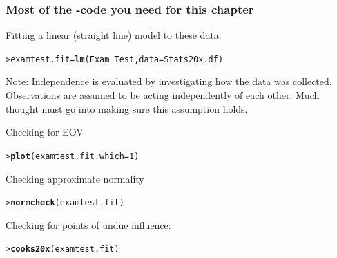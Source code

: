 \documentclass{beamer}\usepackage[]{graphicx}\usepackage[]{xcolor}
\makeatletter
\newcommand{\hlnum}[1]{\textcolor[rgb]{0.686,0.059,0.569}{#1}}%
\newcommand{\hlopt}[1]{\textcolor[rgb]{0,0,0}{#1}}%
\newcommand{\hlstd}[1]{\textcolor[rgb]{0.345,0.345,0.345}{#1}}%
\newcommand{\hlkwb}[1]{\textcolor[rgb]{0.69,0.353,0.396}{#1}}%
\newcommand{\hlkwc}[1]{\textcolor[rgb]{0.333,0.667,0.333}{#1}}%
\newcommand{\hlkwd}[1]{\textcolor[rgb]{0.737,0.353,0.396}{\textbf{#1}}}%
\newenvironment{kframe}{%
 \def\at@end@of@kframe{}%
 \ifinner\ifhmode%
  \def\at@end@of@kframe{\end{minipage}}%
  \begin{minipage}{\columnwidth}%
 \fi\fi%
 \def\FrameCommand##1{\hskip\@totalleftmargin \hskip-\fboxsep
 \colorbox{shadecolor}{##1}\hskip-\fboxsep
     \hskip-\linewidth \hskip-\@totalleftmargin \hskip\columnwidth}%
 \MakeFramed {\advance\hsize-\width
   \@totalleftmargin\z@ \linewidth\hsize
   \@setminipage}}%
 {\par\unskip\endMakeFramed%
 \at@end@of@kframe}
\newenvironment{knitrout}{}{} %
\makeatother
\begin{document}
\begin{frame}[fragile]
\frametitle{Most of the -code you need for this chapter}

Fitting a linear (straight line) model to these data.


\begin{knitrout}\scriptsize
{}\color{fgcolor}\begin{kframe}
\begin{alltt}
\hlstd{> }\hlstd{examtest.fit}\hlkwb{=}\hlkwd{lm}\hlstd{(Exam}\hlopt{~}\hlstd{Test,} \hlkwc{data}\hlstd{=Stats20x.df)}
\end{alltt}
\end{kframe}
\end{knitrout}

Note: Independence is evaluated by investigating how the data was collected. Observations are assumed to be acting independently of each other. Much thought must go into making sure this assumption holds.

Checking for EOV

\begin{knitrout}\scriptsize
{}\color{fgcolor}\begin{kframe}
\begin{alltt}
\hlstd{> }\hlkwd{plot}\hlstd{(}\hlkwc{examtest.fit.which}\hlstd{=}\hlnum{1}\hlstd{)}
\end{alltt}
\end{kframe}
\end{knitrout}

Checking approximate normality
\begin{knitrout}\scriptsize
{}\color{fgcolor}\begin{kframe}
\begin{alltt}
\hlstd{> }\hlkwd{normcheck}\hlstd{(examtest.fit)}
\end{alltt}
\end{kframe}
\end{knitrout}

Checking for points of undue influence:

\begin{knitrout}\scriptsize
{}\color{fgcolor}\begin{kframe}
\begin{alltt}
\hlstd{> }\hlkwd{cooks20x}\hlstd{(examtest.fit)}
\end{alltt}
\end{kframe}
\end{knitrout}



\end{frame}
\end{document}
